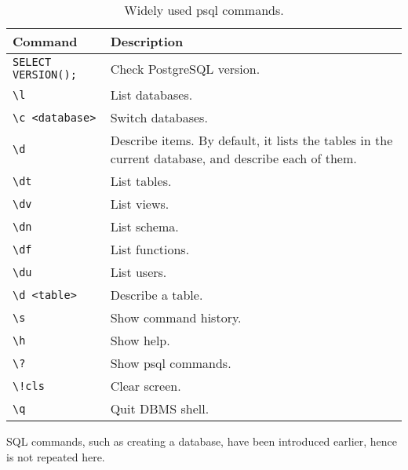 \begin{table}[!htb]
	\centering \caption{Widely used psql commands.}\label{ch:db:tab:psqlcommands}
	\begin{tabularx}{\textwidth}{lX}
		\hline
		Command & Description \\ \hline
		\verb|SELECT VERSION();| & Check PostgreSQL version. \\ 
		\verb|\l| & List databases. \\ 
		\verb|\c <database>| & Switch databases. \\ 
		\verb|\d| & Describe items. By default, it lists the tables in the current database, and describe each of them. \\ 
		\verb|\dt| & List tables. \\ 
		\verb|\dv| & List views. \\ 
		\verb|\dn| & List schema. \\ 
		\verb|\df| & List functions. \\ 
		\verb|\du| & List users. \\ 
		\verb|\d <table>| & Describe a table. \\ 
		\verb|\s| & Show command history. \\ 
		\verb|\h| & Show help. \\ 
		\verb|\?| & Show psql commands. \\ 
		\verb|\!cls| & Clear screen. \\ 
		\verb|\q| & Quit DBMS shell. \\
		\hline
	\end{tabularx}
\end{table}

SQL commands, such as creating a database, have been introduced earlier, hence is not repeated here. 
